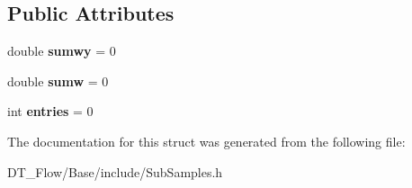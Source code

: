 \subsection*{Public Attributes}
\begin{DoxyCompactItemize}
\item 
\mbox{\label{structQn_1_1Sample_a8cb417e79027ed2406a86a0cd4dd598e}} 
double {\bfseries sumwy} = 0
\item 
\mbox{\label{structQn_1_1Sample_a7bd47c93df504d94e8913e2ff230890e}} 
double {\bfseries sumw} = 0
\item 
\mbox{\label{structQn_1_1Sample_a8ea139ea599517c42882e236d2eebcee}} 
int {\bfseries entries} = 0
\end{DoxyCompactItemize}


The documentation for this struct was generated from the following file\+:\begin{DoxyCompactItemize}
\item 
D\+T\+\_\+\+Flow/\+Base/include/Sub\+Samples.\+h\end{DoxyCompactItemize}
